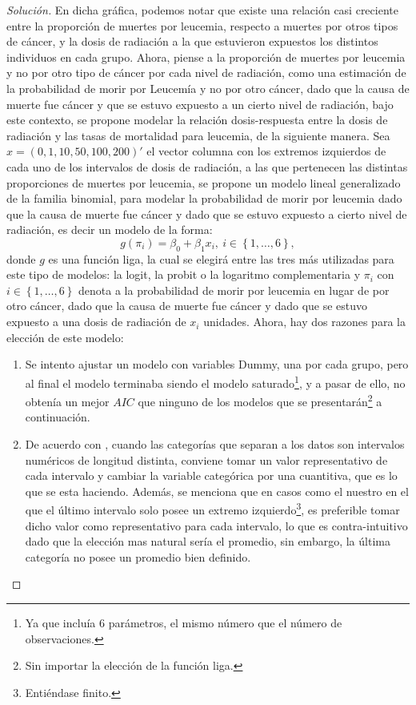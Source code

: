 \documentclass[10.5pt,notitlepage]{article}
\newenvironment{solucion}
  {\begin{proof}[Solución]}
  {\end{proof}}
\newcommand{\kis}[1]{\left\{ #1 \right\}}
\theoremstyle{plain}
\begin{document}
\begin{solucion}
En dicha gráfica, podemos notar que existe una relación casi creciente entre la proporción de muertes por leucemia, respecto a muertes por otros tipos de cáncer, y la dosis de radiación a la que estuvieron expuestos los distintos individuos en cada grupo. Ahora, piense a la proporción de muertes por leucemia y no por otro tipo de cáncer por cada nivel de radiación, como una estimación de la probabilidad de morir por Leucemía y no por otro cáncer, dado que la causa de muerte fue cáncer y que se estuvo expuesto a un cierto nivel de radiación, bajo este contexto, se propone modelar la relación dosis-respuesta entre la dosis de radiación y las tasas de mortalidad para leucemia, de la siguiente manera. Sea \(x = (0,1,10,50,100,200)'\) el vector columna con los extremos izquierdos de cada uno de los intervalos de dosis de radiación, a las que pertenecen las distintas proporciones de muertes por leucemia, se propone un modelo lineal generalizado de la familia binomial, para modelar la probabilidad de morir por leucemia dado que la causa de muerte fue cáncer y dado que se estuvo expuesto a cierto nivel de radiación, es decir un modelo de la forma:
\begin{equation}\label{glm1}
   g(\pi_i) = \beta_0 + \beta_1 x_i, \ i\in \kis{1, \hdots,6},  
\end{equation}
donde \(g\) es una función liga, la cual se elegirá entre las tres más utilizadas para este tipo de modelos: la logit, la probit o la logaritmo complementaria y \(\pi_i\) con \(i \in \kis{1, \hdots, 6}\) denota a la probabilidad de morir por leucemia en lugar de por otro cáncer, dado que la causa de muerte fue cáncer y dado que se estuvo expuesto a una dosis de radiación de \(x_i\) unidades. Ahora, hay dos razones para la elección de este modelo: 
\begin{enumerate}
    \item Se intento ajustar un modelo con variables Dummy, una por cada grupo, pero al final el modelo terminaba siendo el modelo saturado\footnote{Ya que incluía 6 parámetros, el mismo número que el número de observaciones.}, y a pasar de ello, no obtenía un mejor \(AIC\) que ninguno de los modelos que se presentarán\footnote{Sin importar la elección de la función liga.} a continuación.   
    \item De acuerdo con \textcite{dunn_generalized_2018}, cuando las categorías que separan a los datos son intervalos numéricos de longitud distinta, conviene tomar un valor representativo de cada intervalo y cambiar la variable categórica por una cuantitiva, que es lo que se esta haciendo. Además, se menciona que en casos como el nuestro en el que el último intervalo solo posee un extremo izquierdo\footnote{Entiéndase finito.}, es preferible tomar dicho valor como representativo para cada intervalo, lo que es contra-intuitivo dado que la elección mas natural sería el promedio, sin embargo, la última categoría no posee un promedio bien definido.

\end{enumerate}
\end{solucion}
\end{document}
